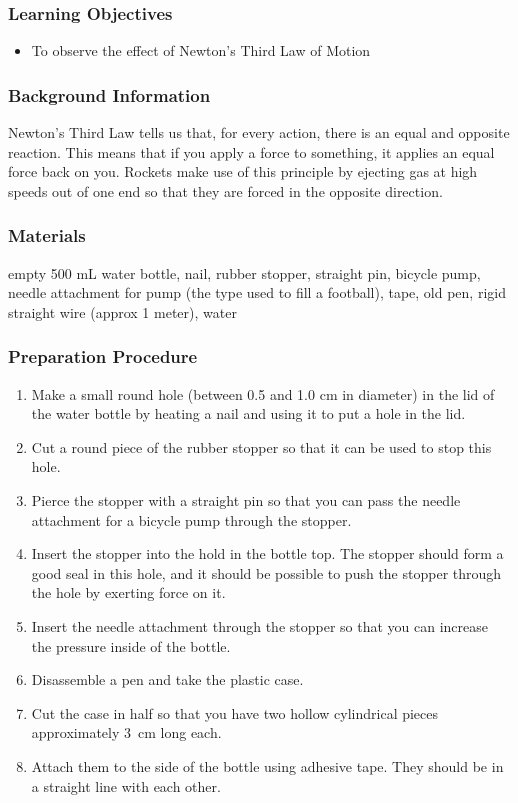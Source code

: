 \subsubsection*{Learning Objectives}
\begin{itemize}
\item{To observe the effect of Newton's Third Law of Motion}
\end{itemize}

\subsubsection*{Background Information}
Newton's Third Law tells us that, for every action, there is an equal and opposite reaction.  This means that if you apply a force to something, it applies an equal force back on you.  Rockets make use of this principle by ejecting gas at high speeds out of one end so that they are forced in the opposite direction.

\subsubsection*{Materials}
empty 500 mL water bottle, nail, rubber stopper, straight pin, bicycle pump, needle attachment for pump (the type used to fill a football), tape, old pen, rigid straight wire (approx 1 meter), water

\subsubsection*{Preparation Procedure}
\begin{enumerate}
\item{Make a small round hole (between 0.5 and 1.0 cm in diameter) in the lid of the water bottle by heating a nail and using it to put a hole in the lid.}
\item{Cut a round piece of the rubber stopper so that it can be used to stop this hole.}
\item{Pierce the stopper with a straight pin so that you can pass the needle attachment for a bicycle pump through the stopper.}
\item{Insert the stopper into the hold in the bottle top. The stopper should form a good seal in this hole, and it should be possible to push the stopper through the hole by exerting force on it.}
\item{Insert the needle attachment through the stopper so that you can increase the pressure inside of the bottle.}
\item{Disassemble a pen and take the plastic case.}
\item{Cut the case in half so that you have two hollow cylindrical pieces approximately 3~cm long each.}
\item{Attach them to the side of the bottle using adhesive tape. They should be in a straight line with each other.} 
\end{enumerate}

